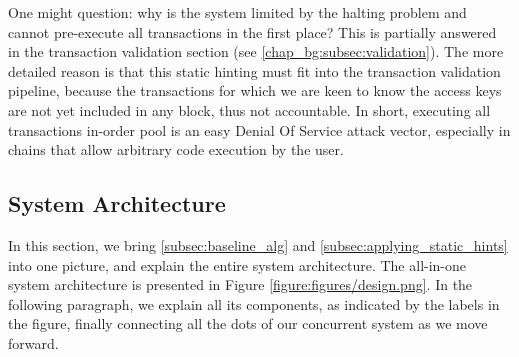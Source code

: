 \begin{remark}
    One might question: why is the system limited by the halting problem and cannot pre-execute all
    transactions in the first place? This is partially answered in the transaction validation
    section (see \ref{chap_bg:subsec:validation}). The more detailed reason is that this static
    hinting must fit into the transaction validation pipeline, because the transactions for which we
    are keen to know the access keys are not yet included in any block, thus not accountable. In
    short, executing all transactions in-order pool is an easy Denial Of Service attack vector,
    especially in chains that allow arbitrary code execution by the user.
\end{remark}

\subsection{System Architecture}

In this section, we bring \ref{subsec:baseline_alg} and \ref{subsec:applying_static_hints} into one
picture, and explain the entire system architecture. The all-in-one system architecture is presented
in Figure \ref{figure:figures/design.png}. In the following paragraph, we explain all its
components, as indicated by the labels in the figure, finally connecting all the dots of our
concurrent system as we move forward.



